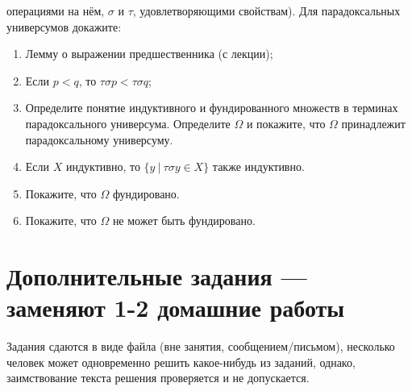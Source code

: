 \documentclass[10pt,a4paper,oneside]{article}
\begin{document}
\begin{enumerate}
операциями на нём, $\sigma$ и $\tau$, удовлетворяющими свойствам).
Для парадоксальных универсумов докажите:
\begin{enumerate}
\item Лемму о выражении предшественника (с лекции);
\item Если $p < q$, то $\tau\sigma p < \tau\sigma q$;
\item Определите понятие индуктивного и фундированного множеств в терминах парадоксального универсума. Определите $\Omega$ и
покажите, что $\Omega$ принадлежит парадоксальному универсуму.
\item Если $X$ индуктивно, то $\{y\ |\ \tau\sigma y \in X\}$ также индуктивно.
\item Покажите, что $\Omega$ фундировано.
\item Покажите, что $\Omega$ не может быть фундировано.
\end{enumerate}
\end{enumerate}

\section*{Дополнительные задания --- заменяют 1-2 домашние работы}

Задания сдаются в виде файла (вне занятия, сообщением/письмом), несколько человек может одновременно
решить какое-нибудь из заданий, однако, заимствование текста решения проверяется и не допускается.
\end{document}
